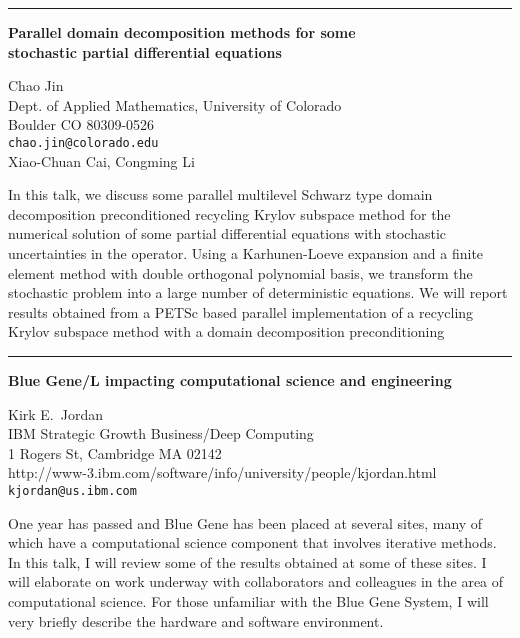 \documentclass[twosided]{report}
\begin{document}
	\begin{center} \rule{6in}{1pt} \end{center}

\begin{center}
{\large			%
{\bf Parallel domain decomposition methods for some \\
	stochastic partial differential equations}}

	Chao Jin \\
	Dept. of Applied Mathematics, University of Colorado \\
	Boulder  CO  80309-0526 \\
	{\tt chao.jin@colorado.edu} \\
	Xiao-Chuan Cai, Congming Li
\end{center}
In this talk, we discuss some  parallel multilevel Schwarz
type domain decomposition preconditioned recycling Krylov
subspace method for the numerical solution of some partial
differential equations with stochastic uncertainties in the
operator. Using a Karhunen-Loeve expansion and a finite
element method with double orthogonal polynomial basis, we
transform the stochastic problem into a large number of
deterministic equations. We will report results obtained
from a PETSc based parallel implementation of a recycling
Krylov subspace method with a domain decomposition
preconditioning



	\begin{center} \rule{6in}{1pt} \end{center}

\begin{center}
{\large			%
{\bf Blue Gene/L impacting computational science and engineering}}

	Kirk E.~Jordan \\
	IBM Strategic Growth Business/Deep Computing \\
	1 Rogers St, Cambridge MA 02142 \\
	http://www-3.ibm.com/software/info/university/people/kjordan.html \\
	{\tt kjordan@us.ibm.com}
\end{center}
One year has passed and Blue Gene has been placed at several
sites, many of which have a computational science component
that involves iterative methods. In this talk, I will review
some of the results obtained at some of these sites. I will
elaborate on work underway with collaborators and colleagues
in the area of computational science. For those unfamiliar
with the Blue Gene System, I will very briefly describe the
hardware and software environment.
\end{document}
